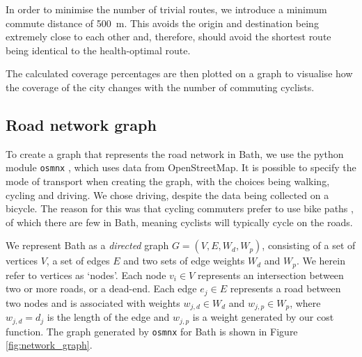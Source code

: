 \documentclass[11pt,twosided,a4paper]{report}
\begin{document}
In order to minimise the number of trivial routes, we introduce a minimum commute distance of 500~m. This avoids the origin and destination being extremely close to each other and, therefore, should avoid the shortest route being identical to the health-optimal route.

The calculated coverage percentages are then plotted on a graph to visualise how the coverage of the city changes with the number of commuting cyclists.


\subsection{Road network graph} \label{network_graph}

To create a graph that represents the road network in Bath, we use the python module \texttt{osmnx} \citep{boeing2017osmnx}, which uses data from OpenStreetMap. It is possible to specify the mode of transport when creating the graph, with the choices being walking, cycling and driving. We chose driving, despite the data being collected on a bicycle. The reason for this was that cycling commuters prefer to use bike paths \citep{broach2012wherecyclistsride, skov_petersen2018cyclingpreferences}, of which there are few in Bath, meaning cyclists will typically cycle on the roads.

We represent Bath as a \textit{directed} graph $G = (V, E, W_d, W_p)$, consisting of a set of vertices $V$, a set of edges $E$ and two sets of edge weights $W_d$ and $W_p$. We herein refer to vertices as `nodes'. Each node $v_i \in V$ represents an intersection between two or more roads, or a dead-end. Each edge $e_j \in E$ represents a road between two nodes and is associated with weights $w_{j, d} \in W_d$ and $w_{j, p} \in W_p$, where $w_{j, d} = d_j$ is the length of the edge and $w_{j, p}$ is a weight generated by our cost function. The graph generated by \texttt{osmnx} for Bath is shown in Figure \ref{fig:network_graph}.
\end{document}
